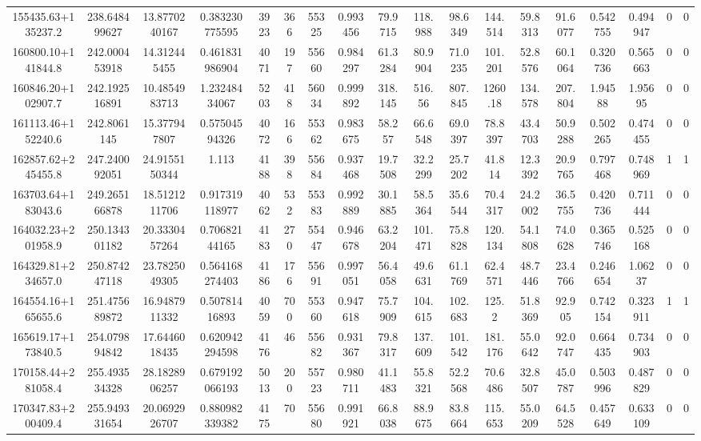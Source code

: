 \begin{table}
\begin{tabular}{cccccccccccccccccc}
155435.63+135237.2 & 238.648499627 & 13.8770240167 & 0.383230775595 & 3923 & 366 & 55325 & 0.993456 & 79.9715 & 118.988 & 98.6349 & 144.514 & 59.8313 & 91.6077 & 0.542755 & 0.494947 & 0 & 0 \\
160800.10+141844.8 & 242.000453918 & 14.312445455 & 0.461831986904 & 4071 & 197 & 55660 & 0.984297 & 61.3284 & 80.9904 & 71.0235 & 101.201 & 52.8576 & 60.1064 & 0.320736 & 0.565663 & 0 & 0 \\
160846.20+102907.7 & 242.192516891 & 10.4854983713 & 1.23248434067 & 5203 & 418 & 56034 & 0.999892 & 318.145 & 516.56 & 807.845 & 1260.18 & 134.578 & 207.804 & 1.94588 & 1.95695 & 0 & 0 \\
161113.46+152240.6 & 242.8061145 & 15.377947807 & 0.57504594326 & 4072 & 166 & 55362 & 0.983675 & 58.257 & 66.6548 & 69.0397 & 78.8397 & 43.4703 & 50.9288 & 0.502265 & 0.474455 & 0 & 0 \\
162857.62+245455.8 & 247.240092051 & 24.9155150344 & 1.113 & 4188 & 398 & 55684 & 0.937468 & 19.7508 & 32.2299 & 25.7202 & 41.814 & 12.3392 & 20.9765 & 0.797468 & 0.748969 & 1 & 1 \\
163703.64+183043.6 & 249.265166878 & 18.5121211706 & 0.917319118977 & 4062 & 532 & 55383 & 0.992889 & 30.1885 & 58.5364 & 35.6544 & 70.4317 & 24.2002 & 36.5755 & 0.420736 & 0.711444 & 0 & 0 \\
164032.23+201958.9 & 250.134301182 & 20.3330457264 & 0.70682144165 & 4183 & 270 & 55447 & 0.946678 & 63.2204 & 101.471 & 75.8828 & 120.134 & 54.1808 & 74.0628 & 0.365746 & 0.525168 & 0 & 0 \\
164329.81+234657.0 & 250.874247118 & 23.7825049305 & 0.564168274403 & 4186 & 176 & 55691 & 0.997051 & 56.4058 & 49.6631 & 61.1769 & 62.4571 & 48.7446 & 23.4766 & 0.246654 & 1.06237 & 0 & 0 \\
164554.16+165655.6 & 251.475689872 & 16.9487911332 & 0.50781416893 & 4059 & 700 & 55360 & 0.947618 & 75.7909 & 104.615 & 102.683 & 125.2 & 51.8369 & 92.905 & 0.742154 & 0.323911 & 1 & 1 \\
165619.17+173840.5 & 254.079894842 & 17.6446018435 & 0.620942294598 & 4176 & 46 & 55682 & 0.931367 & 79.8317 & 137.609 & 101.542 & 181.176 & 55.0642 & 92.0747 & 0.664435 & 0.734903 & 0 & 0 \\
170158.44+281058.4 & 255.493534328 & 28.1828906257 & 0.679192066193 & 5013 & 200 & 55723 & 0.980711 & 41.1483 & 55.8321 & 52.2568 & 70.6486 & 32.8507 & 45.0787 & 0.503996 & 0.487829 & 0 & 0 \\
170347.83+200409.4 & 255.949331654 & 20.0692926707 & 0.880982339382 & 4175 & 70 & 55680 & 0.991921 & 66.8038 & 88.9675 & 83.8664 & 115.653 & 55.0209 & 64.5528 & 0.457649 & 0.633109 & 0 & 0 \\

\end{tabular}
\end{table}
